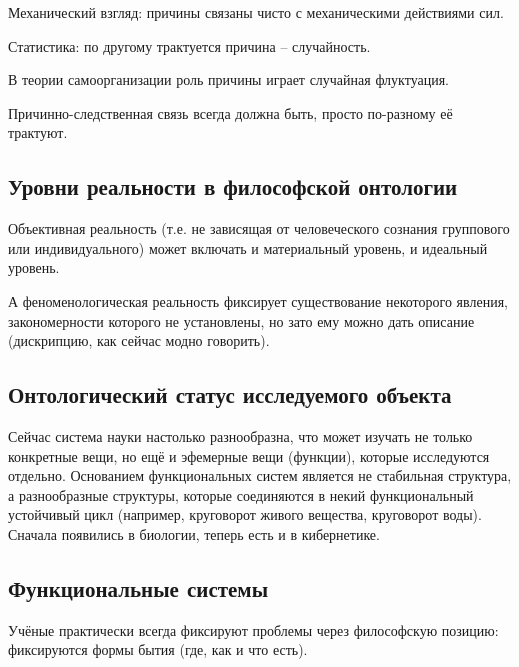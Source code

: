 \documentclass[main.tex]{subfiles}
\begin{document}
Механический взгляд: причины связаны чисто с механическими действиями сил.

Статистика: по другому трактуется причина -- случайность.

В теории самоорганизации роль причины играет случайная флуктуация.

Причинно-следственная связь всегда должна быть, просто по-разному её трактуют.


\subsection{Уровни реальности в философской онтологии}


Объективная реальность (т.е. не зависящая от человеческого сознания группового или индивидуального) может включать и материальный уровень, и идеальный уровень.

А феноменологическая реальность фиксирует существование некоторого явления, закономерности которого не установлены, но зато ему можно дать описание (дискрипцию, как сейчас модно говорить).

\subsection{Онтологический статус исследуемого объекта}


Сейчас система науки настолько разнообразна, что может изучать не только конкретные вещи, но ещё и эфемерные вещи (функции), которые исследуются отдельно.
Основанием функциональных систем является не стабильная структура, а разнообразные структуры, которые соединяются в некий функциональный устойчивый цикл (например, круговорот живого вещества, круговорот воды).
Сначала появились в биологии, теперь есть и в кибернетике.

\subsection{Функциональные системы}


Учёные практически всегда фиксируют проблемы через философскую позицию: фиксируются формы бытия (где, как и что есть).

\end{document}
